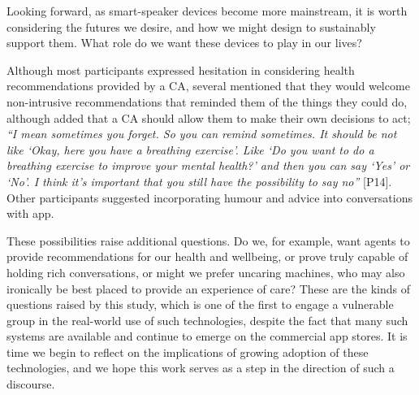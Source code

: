         Looking forward, as smart-speaker devices become more mainstream, it is worth considering the futures we desire, and how we might design to sustainably support them. What role do we want these devices to play in our lives? 
        
        Although most participants expressed hesitation in considering health recommendations provided by a \ac{CA}, several mentioned that they would welcome non-intrusive recommendations that reminded them of the things they could do, although added that a \ac{CA} should allow them to make their own decisions to act;  \textit{``I mean sometimes you forget. So you can remind sometimes. It should be not like `Okay, here you have a breathing exercise'. Like `Do you want to do a breathing exercise to improve your mental health?' and then you can say `Yes' or `No'. I think it's important that you still have the possibility to say no''} [P14]. Other participants suggested incorporating humour and advice into conversations with \acl{app}.
        
        These possibilities raise additional questions. Do we, for example, want agents to provide recommendations for our health and wellbeing, or prove truly capable of holding rich conversations, or might we prefer uncaring machines, who may also ironically be best placed to provide an experience of care? These are the kinds of questions raised by this study, which is one of the first to engage a vulnerable group in the real-world use of such technologies, despite the fact that many such systems are available and continue to emerge on the commercial app stores. It is time we begin to reflect on the implications of growing adoption of these technologies, and we hope this work serves as a step in the direction of such a discourse.
                
